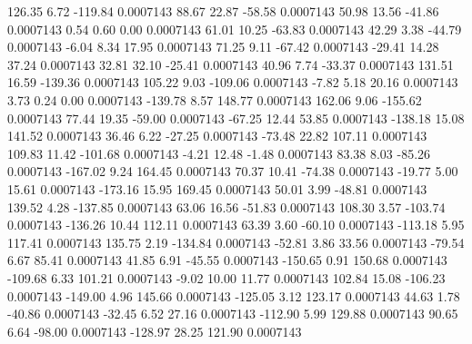       126.35        6.72     -119.84     0.0007143
       88.67       22.87      -58.58     0.0007143
       50.98       13.56      -41.86     0.0007143
        0.54        0.60        0.00     0.0007143
       61.01       10.25      -63.83     0.0007143
       42.29        3.38      -44.79     0.0007143
       -6.04        8.34       17.95     0.0007143
       71.25        9.11      -67.42     0.0007143
      -29.41       14.28       37.24     0.0007143
       32.81       32.10      -25.41     0.0007143
       40.96        7.74      -33.37     0.0007143
      131.51       16.59     -139.36     0.0007143
      105.22        9.03     -109.06     0.0007143
       -7.82        5.18       20.16     0.0007143
        3.73        0.24        0.00     0.0007143
     -139.78        8.57      148.77     0.0007143
      162.06        9.06     -155.62     0.0007143
       77.44       19.35      -59.00     0.0007143
      -67.25       12.44       53.85     0.0007143
     -138.18       15.08      141.52     0.0007143
       36.46        6.22      -27.25     0.0007143
      -73.48       22.82      107.11     0.0007143
      109.83       11.42     -101.68     0.0007143
       -4.21       12.48       -1.48     0.0007143
       83.38        8.03      -85.26     0.0007143
     -167.02        9.24      164.45     0.0007143
       70.37       10.41      -74.38     0.0007143
      -19.77        5.00       15.61     0.0007143
     -173.16       15.95      169.45     0.0007143
       50.01        3.99      -48.81     0.0007143
      139.52        4.28     -137.85     0.0007143
       63.06       16.56      -51.83     0.0007143
      108.30        3.57     -103.74     0.0007143
     -136.26       10.44      112.11     0.0007143
       63.39        3.60      -60.10     0.0007143
     -113.18        5.95      117.41     0.0007143
      135.75        2.19     -134.84     0.0007143
      -52.81        3.86       33.56     0.0007143
      -79.54        6.67       85.41     0.0007143
       41.85        6.91      -45.55     0.0007143
     -150.65        0.91      150.68     0.0007143
     -109.68        6.33      101.21     0.0007143
       -9.02       10.00       11.77     0.0007143
      102.84       15.08     -106.23     0.0007143
     -149.00        4.96      145.66     0.0007143
     -125.05        3.12      123.17     0.0007143
       44.63        1.78      -40.86     0.0007143
      -32.45        6.52       27.16     0.0007143
     -112.90        5.99      129.88     0.0007143
       90.65        6.64      -98.00     0.0007143
     -128.97       28.25      121.90     0.0007143
